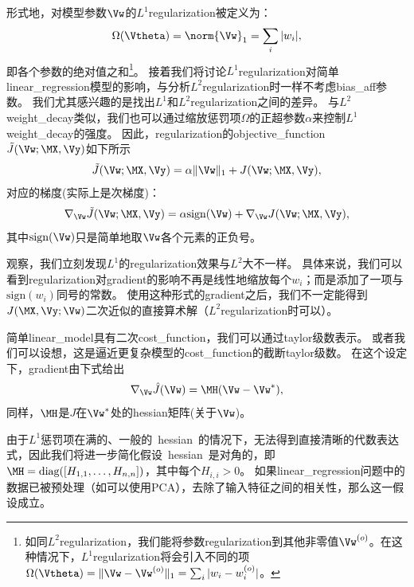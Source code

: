 形式地，对模型参数$\Vw$的$L^1$\gls{regularization}被定义为：
\begin{align}
 \Omega(\Vtheta) = \norm{ \Vw }_1 = \sum_i | w_i |,
 \end{align}
即各个参数的绝对值之和\footnote{如同$L^2$\gls{regularization}，我们能将参数\gls{regularization}到其他非零值$\Vw^{(o)}$。在这种情况下，$L^1$\gls{regularization}将会引入不同的项$\Omega(\Vtheta)=
\|\Vw - \Vw^{(o)} \|_1 = \sum_i | w_i - w_i^{(o)} |$。}。
接着我们将讨论$L^1$\gls{regularization}对简单\gls{linear_regression}模型的影响，与分析$L^2$\gls{regularization}时一样不考虑\gls{bias_aff}参数。  
我们尤其感兴趣的是找出$L^1$和$L^2$\gls{regularization}之间的差异。
与$L^2$\gls{weight_decay}类似，我们也可以通过缩放惩罚项$\Omega$的正超参数$\alpha$来控制$L^1$\gls{weight_decay}的强度。 
因此，\gls{regularization}的\gls{objective_function} $\tilde{J}(\Vw;\MX, \Vy)$如下所示
\begin{align}
\tilde{J}(\Vw;\MX, \Vy) = \alpha \| \Vw \|_1 +  J(\Vw;\MX, \Vy) ,
\end{align}
对应的梯度(实际上是次梯度)：
\begin{align}
\label{eq:subgradient}
  \nabla_{\Vw} \tilde{J}(\Vw; \MX, \Vy) = \alpha \text{sign}(\Vw) + \nabla_{\Vw} J(\Vw; \MX, \Vy), %
\end{align}
其中$\text{sign}(\Vw)$只是简单地取$\Vw$各个元素的正负号。


观察，我们立刻发现$L^1$的\gls{regularization}效果与$L^2$大不一样。
具体来说，我们可以看到\gls{regularization}对\gls{gradient}的影响不再是线性地缩放每个$w_i$；而是添加了一项与$\text{sign}(w_i)$同号的常数。
使用这种形式的\gls{gradient}之后，我们不一定能得到$J(\MX, \Vy;\Vw)$二次近似的直接算术解（$L^2$\gls{regularization}时可以）。 
 
简单\gls{linear_model}具有二次\gls{cost_function}，我们可以通过\gls{taylor}级数表示。
或者我们可以设想，这是逼近更复杂模型的\gls{cost_function}的截断\gls{taylor}级数。
在这个设定下，\gls{gradient}由下式给出
\begin{align}
  \nabla_{\Vw} \hat{J}(\Vw) = \MH (\Vw - \Vw^*),
\end{align}
同样，$\MH$是$J$在$\Vw^*$处的\gls{hessian}矩阵(关于$\Vw$)。

由于$L^1$惩罚项在满的、一般的~\gls{hessian}~的情况下，无法得到直接清晰的代数表达式，因此我们将进一步简化假设~\gls{hessian}~是对角的，即$\MH = \text{diag}([H_{1,1},\dots, H_{n,n}])$，其中每个$H_{i,i}>0$。
如果\gls{linear_regression}问题中的数据已被预处理（如可以使用PCA），去除了输入特征之间的相关性，那么这一假设成立。

